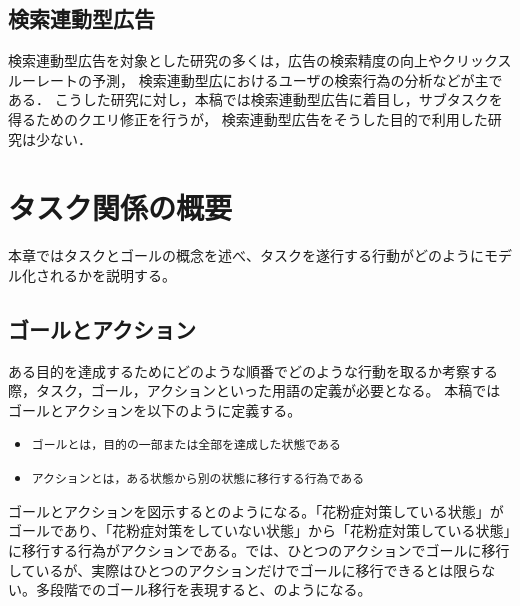 \documentclass[submit,techreq]{ipsj}
\def\|{\verb|}
\begin{document}
\subsection{検索連動型広告}
検索連動型広告を対象とした研究の多くは，広告の検索精度の向上\cite{BroderAdQueryExpansion}やクリックスルーレートの予測\cite{RichardsonEstimatingCTR}，
検索連動型広におけるユーザの検索行為の分析\cite{jansen2005examining,DanescuNiculescuMizilInterplayAd}などが主である．
こうした研究に対し，本稿では検索連動型広告に着目し，サブタスクを得るためのクエリ修正を行うが，
検索連動型広告をそうした目的で利用した研究は少ない\cite{yamamoto2012wisdom}．

%%あれ，これ日本語の文献なくね？？
%本稿では検索連動型広告に着目し，サブタスクを得るためのクエリ修正を行うが，
%検索連動型広告に着目した同様の研究として，田麦らの研究がある．
%田麦らは，``中古ギターを売りたい''という情報要求を持ったユーザの場合，``中古ギター　売却''というクエリでウェブ検索を行うよりも，``中古ギター　買い取り''というように，中古ギターの買い取り業者というサービス提供者側の視点に立ったクエリでウェブ検索をした方が，
%目的に適したページを得られやすいことを指摘している．
%彼らはこの点に着目し，検索連動型広告を用いることで，``売却''に対する``買い取り''のように，
%サービスを享受する側と提供する側で逆位関係にある動詞を自動的に発見し，クエリ拡張に用いる手法を提案している．


%3
\section{タスク関係の概要}\label{sec:task}
本章ではタスクとゴールの概念を述べ、タスクを遂行する行動がどのようにモデル化されるかを説明する。


%3.1
\subsection{ゴールとアクション}
ある目的を達成するためにどのような順番でどのような行動を取るか考察する際，タスク，ゴール，アクションといった用語の定義が必要となる。
本稿ではゴールとアクションを以下のように定義する。

\begin{itemize}
\item \|ゴールとは，目的の一部または全部を達成した状態である|
\item \|アクションとは，ある状態から別の状態に移行する行為である|
\end{itemize}

ゴールとアクションを図示するとのようになる。「花粉症対策している状態」がゴールであり、「花粉症対策をしていない状態」から「花粉症対策している状態」に移行する行為がアクションである。では、ひとつのアクションでゴールに移行しているが、実際はひとつのアクションだけでゴールに移行できるとは限らない。多段階でのゴール移行を表現すると、のようになる。
\end{document}
